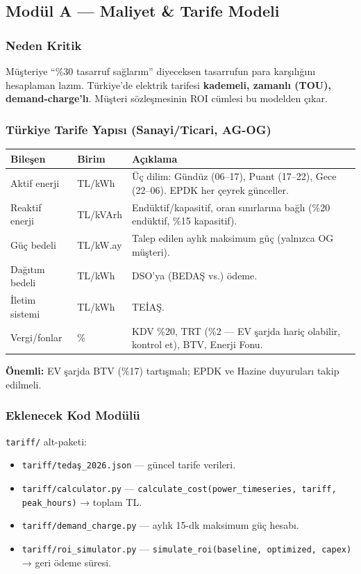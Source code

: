 \documentclass[11pt,a4paper]{article}
\begin{document}
\subsection{Modül A — Maliyet \& Tarife Modeli}

\subsubsection{Neden Kritik}
Müşteriye ``\%30 tasarruf sağlarım'' diyeceksen tasarrufun para karşılığını hesaplaman lazım. Türkiye'de elektrik tarifesi \textbf{kademeli, zamanlı (TOU), demand-charge'lı}. Müşteri sözleşmesinin ROI cümlesi bu modelden çıkar.

\subsubsection{Türkiye Tarife Yapısı (Sanayi/Ticari, AG-OG)}

\begin{tabularx}{\textwidth}{l l X}
\toprule
\textbf{Bileşen} & \textbf{Birim} & \textbf{Açıklama} \\
\midrule
Aktif enerji & TL/kWh & Üç dilim: Gündüz (06--17), Puant (17--22), Gece (22--06). EPDK her çeyrek günceller. \\
Reaktif enerji & TL/kVArh & Endüktif/kapasitif, oran sınırlarına bağlı (\%20 endüktif, \%15 kapasitif). \\
Güç bedeli & TL/kW.ay & Talep edilen aylık maksimum güç (yalnızca OG müşteri). \\
Dağıtım bedeli & TL/kWh & DSO'ya (BEDAŞ vs.) ödeme. \\
İletim sistemi & TL/kWh & TEİAŞ. \\
Vergi/fonlar & \% & KDV \%20, TRT (\%2 — EV şarjda hariç olabilir, kontrol et), BTV, Enerji Fonu. \\
\bottomrule
\end{tabularx}

\textbf{Önemli:} EV şarjda BTV (\%17) tartışmalı; EPDK ve Hazine duyuruları takip edilmeli.

\subsubsection{Eklenecek Kod Modülü}

\texttt{tariff/} alt-paketi:
\begin{itemize}
    \item \texttt{tariff/tedaş\_2026.json} — güncel tarife verileri.
    \item \texttt{tariff/calculator.py} — \texttt{calculate\_cost(power\_timeseries, tariff, peak\_hours)} → toplam TL.
    \item \texttt{tariff/demand\_charge.py} — aylık 15-dk maksimum güç hesabı.
    \item \texttt{tariff/roi\_simulator.py} — \texttt{simulate\_roi(baseline, optimized, capex)} → geri ödeme süresi.
\end{itemize}
\end{document}
